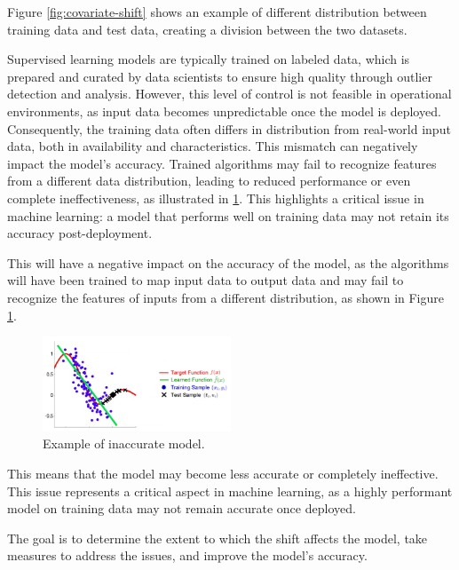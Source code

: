 Figure \ref{fig:covariate-shift} shows an example of different distribution between training data and test data, creating a division between the two datasets.  
	
Supervised learning models are typically trained on labeled data, which is prepared and curated by data scientists to ensure high quality through outlier detection and analysis. However, this level of control is not feasible in operational environments, as input data becomes unpredictable once the model is deployed. Consequently, the training data often differs in distribution from real-world input data, both in availability and characteristics. This mismatch can negatively impact the model's accuracy. Trained algorithms may fail to recognize features from a different data distribution, leading to reduced performance or even complete ineffectiveness, as illustrated in \cref{fig:inaccurate-model}. This highlights a critical issue in machine learning: a model that performs well on training data may not retain its accuracy post-deployment.

	
This will have a negative impact on the accuracy of the model, as the algorithms will have been trained to map input data to output data and may fail to recognize the features of inputs from a different distribution, as shown in Figure \ref{fig:inaccurate-model}.  
	

	\begin{figure}[H]
		\centering
		\includegraphics[width=0.5\textwidth]{assets/covariate_shift.png} 
		\caption{Example of inaccurate model.}
		\label{fig:inaccurate-model}
	\end{figure}  

\vspace{0.5cm}

This means that the model may become less accurate or completely ineffective. This issue represents a critical aspect in machine learning, as a highly performant model on training data may not remain accurate once deployed.

The goal is to determine the extent to which the shift affects the model, take measures to address the issues, and improve the model's accuracy.
	
